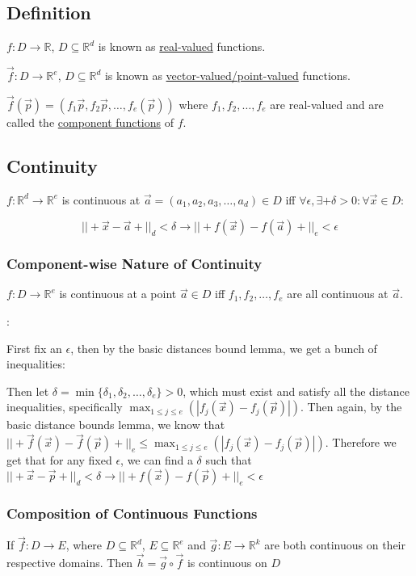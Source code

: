 \documentclass[11 pt, twoside]{article}
\begin{document}
\subsection{Definition}

$f: D \to \mathbb{R}$, $D \subseteq \mathbb{R}^d$ is known as
\underline{real-valued} functions.

$\vec{f}: D \to \mathbb{R}^e$, $D \subseteq \mathbb{R}^d$ is known as
\underline{vector-valued/point-valued} functions.

$\vec{f}(\vec{p}) = (f_1{\vec{p}}, f_2{\vec{p}}, \dots, f_e(\vec{p}))$ where
$f_1, f_2, \dots, f_e$ are real-valued and are called the \underline{component
functions} of $f$.

\subsection{Continuity}
$f: \mathbb{R}^d \to \mathbb{R}^e$ is continuous at $\vec{a} = (a_1, a_2,
a_3, \dots, a_d) \in D$ iff $\forall \epsilon, \exists+\delta > 0 : \forall \vec{x} \in D$:

$$||+\vec{x} - \vec{a}+||_d < \delta \to ||+f(\vec{x}) - f(\vec{a})+||_e <
\epsilon$$

\subsubsection{Component-wise Nature of Continuity}
$f: D \to \mathbb{R}^e$ is continuous at a point $\vec{a} \in D$ iff $f_1,
f_2, \dots, f_e$ are all continuous at $\vec{a}$.

:

First fix an $\epsilon$, then by the basic distances bound lemma, we get a
bunch of inequalities:

Then let $\delta = \min\{\delta_1, \delta_2, \dots, \delta_e\} > 0$, which must
exist and satisfy all the distance inequalities, specifically $\max_{1 \leq j
\leq e}(|f_j(\vec{x}) - f_j(\vec{p})|)$. Then again, by the basic distance
bounds lemma, we know that $||+\vec{f}(\vec{x}) - \vec{f}(\vec{p})+||_e \leq \max_{1 \leq j
\leq e}(|f_j(\vec{x}) - f_j(\vec{p})|)$. Therefore we get that for any fixed
$\epsilon$, we can find a $\delta$ such that $||+\vec{x} - \vec{p}+||_d <
\delta \to ||+f(\vec{x}) - f(\vec{p})+||_e < \epsilon$

\subsubsection{Composition of Continuous Functions}
If $\vec{f}: D \to E$, where $D \subseteq \mathbb{R}^d$, $E
\subseteq \mathbb{R}^e$ and $\vec{g}: E \to \mathbb{R}^k$ are both
continuous on their respective domains. Then $\vec{h} = \vec{g} \circ \vec{f}$
is continuous on $D$
\end{document}
